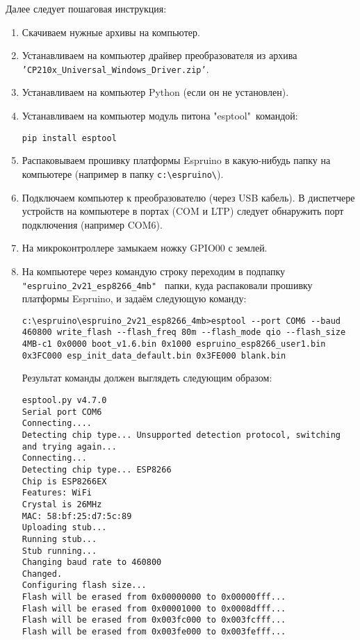 \documentclass[12pt]{extarticle}
\begin{document}
Далее следует пошаговая инструкция:
\begin{enumerate}
	\item Скачиваем нужные архивы на компьютер.
	\item Устанавливаем на компьютер драйвер преобразователя из архива \texttt{'CP210x\_\-Universal\_\-Windows\_\-Driver.zip'}.
	\item Устанавливаем на компьютер Python (если он не установлен).
	\item Устанавливаем на компьютер модуль питона "esptool"\ командой:
	\begin{verbatim}
pip install esptool 
	\end{verbatim}

	\item Распаковываем прошивку платформы Espruino в какую-нибудь папку на компьютере (например в папку \texttt{c:\textbackslash espruino\textbackslash}).
	\item Подключаем компьютер к преобразователю (через USB кабель). В диспетчере устройств на компьютере в портах (COM и LTP) следует обнаружить порт подключения (например COM6).
	\item На микроконтроллере замыкаем ножку GPIO00 с землей.
	\item На компьютере через командую строку переходим в подпапку \texttt{"espruino\-\_2v21\-\_esp8266\_4mb"\ } папки, куда распаковали прошивку платформы Espruino, и задаём следующую команду:
	\begin{verbatim}
c:\espruino\espruino_2v21_esp8266_4mb>esptool --port COM6 --baud 460800 write_flash --flash_freq 80m --flash_mode qio --flash_size 4MB-c1 0x0000 boot_v1.6.bin 0x1000 espruino_esp8266_user1.bin 0x3FC000 esp_init_data_default.bin 0x3FE000 blank.bin 
	\end{verbatim}
Результат команды должен выглядеть следующим образом:
\begin{verbatim}
esptool.py v4.7.0
Serial port COM6
Connecting....
Detecting chip type... Unsupported detection protocol, switching and trying again...
Connecting...
Detecting chip type... ESP8266
Chip is ESP8266EX
Features: WiFi
Crystal is 26MHz
MAC: 58:bf:25:d7:5c:89
Uploading stub...
Running stub...
Stub running...
Changing baud rate to 460800
Changed.
Configuring flash size...
Flash will be erased from 0x00000000 to 0x00000fff...
Flash will be erased from 0x00001000 to 0x0008dfff...
Flash will be erased from 0x003fc000 to 0x003fcfff...
Flash will be erased from 0x003fe000 to 0x003fefff...

\end{verbatim}
\end{enumerate}
\end{document}
